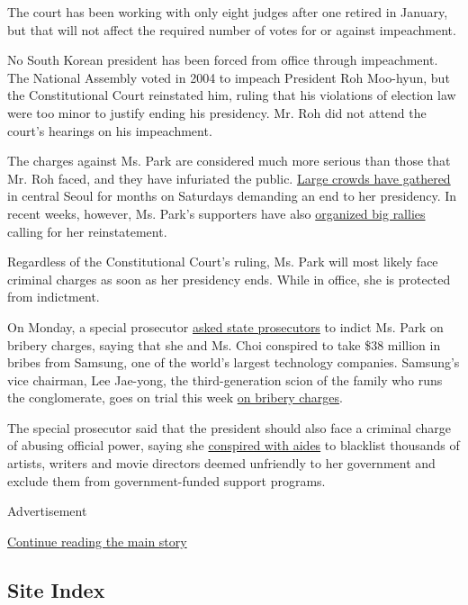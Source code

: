 The court has been working with only eight judges after one retired in
January, but that will not affect the required number of votes for or
against impeachment.

No South Korean president has been forced from office through
impeachment. The National Assembly voted in 2004 to impeach President
Roh Moo-hyun, but the Constitutional Court reinstated him, ruling that
his violations of election law were too minor to justify ending his
presidency. Mr. Roh did not attend the court's hearings on his
impeachment.

The charges against Ms. Park are considered much more serious than those
that Mr. Roh faced, and they have infuriated the public.
\href{https://www.nytimes.com/2016/11/13/world/asia/korea-park-geun-hye-protests.html}{Large
crowds have gathered} in central Seoul for months on Saturdays demanding
an end to her presidency. In recent weeks, however, Ms. Park's
supporters have also
\href{https://www.nytimes.com/2017/02/18/world/asia/south-korea-impeached-leader-park-geun-hye.html}{organized
big rallies} calling for her reinstatement.

Regardless of the Constitutional Court's ruling, Ms. Park will most
likely face criminal charges as soon as her presidency ends. While in
office, she is protected from indictment.

On Monday, a special prosecutor
\href{https://www.nytimes.com/2017/03/06/world/asia/president-park-geun-hye-bribery-korea.html}{asked
state prosecutors} to indict Ms. Park on bribery charges, saying that
she and Ms. Choi conspired to take \$38 million in bribes from Samsung,
one of the world's largest technology companies. Samsung's vice
chairman, Lee Jae-yong, the third-generation scion of the family who
runs the conglomerate, goes on trial this week
\href{https://www.nytimes.com/2017/02/28/world/asia/lee-jae-yong-samsung.html}{on
bribery charges}.

The special prosecutor said that the president should also face a
criminal charge of abusing official power, saying she
\href{https://www.nytimes.com/2017/01/12/world/asia/south-korea-president-park-blacklist-artists.html}{conspired
with aides} to blacklist thousands of artists, writers and movie
directors deemed unfriendly to her government and exclude them from
government-funded support programs.

Advertisement

\protect\hyperlink{after-bottom}{Continue reading the main story}

\hypertarget{site-index}{%
\subsection{Site Index}\label{site-index}}

